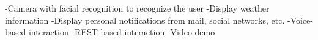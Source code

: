 -Camera with facial recognition to recognize the user\newline
-Display weather information\newline
-Display personal notifications from mail, social networks, etc.\newline
-Voice-based interaction\newline
-REST-based interaction\newline
-Video demo